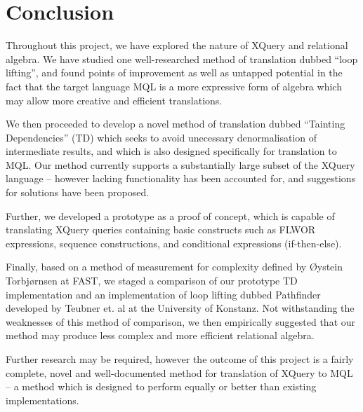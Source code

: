 \chapter{Conclusion}
\label{chapter:conclusion}
Throughout this project, we have explored the nature of XQuery and relational
algebra. We have studied one well-researched method of translation dubbed ``loop
lifting'', and found points of improvement as well as untapped potential in the
fact that the target language MQL is a more expressive form of algebra
which may allow more creative and efficient translations.

We then proceeded to develop a novel method of translation dubbed ``Tainting
Dependencies'' (TD) which seeks to avoid unecessary denormalisation of
intermediate results, and which is also designed specifically for translation
to MQL. Our method currently supports a substantially large subset of the XQuery
language -- however lacking functionality has been accounted for, and suggestions for
solutions have been proposed.

Further, we developed a prototype as a proof of concept, which is capable of
translating XQuery queries containing basic constructs such as FLWOR
expressions, sequence constructions, and conditional expressions (if-then-else).

Finally, based on a method of measurement for complexity defined by \O ystein
Torbj\o rnsen at FAST, we staged a comparison of our prototype TD implementation
and an implementation of loop lifting dubbed Pathfinder developed by Teubner
et. al at the University of Konstanz. Not withstanding the weaknesses of this
method of comparison, we then empirically suggested that our method may
produce less complex and more efficient relational algebra.

Further research may be required, however the outcome of this project is a
fairly complete, novel and well-documented method for translation of XQuery to
MQL -- a method which is designed to perform equally or better than existing
implementations.

% 
